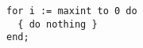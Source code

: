 \documentclass{article}
\begin{document}
\lstset{language=Pascal}

\begin{lstlisting}
for i := maxint to 0 do
  { do nothing }
end;
\end{lstlisting}
\end{document}
